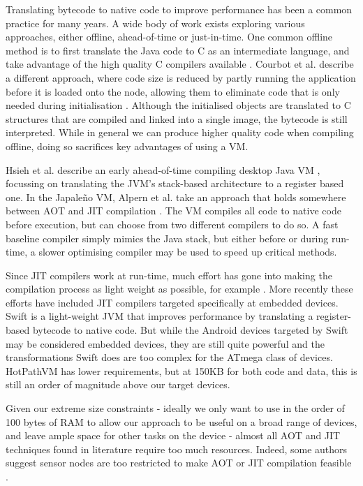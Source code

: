 Translating bytecode to native code to improve performance has been a common practice for many years. A wide body of work exists exploring various approaches, either offline, ahead-of-time  or just-in-time. One common offline method is to first translate the Java code to C as an intermediate language, and take advantage of the high quality C compilers available \cite{Muller:1997}. Courbot et al. describe a different approach, where code size is reduced by partly running the application before it is loaded onto the node, allowing them to eliminate code that is only needed during initialisation \cite{Courbot:2010}. Although the initialised objects are translated to C structures that are compiled and linked into a single image, the bytecode is still interpreted. While in general we can produce higher quality code when compiling offline, doing so sacrifices key advantages of using a VM.

Hsieh et al. describe an early ahead-of-time compiling desktop Java VM \cite{Hsieh:1996cy}, focussing on translating the JVM's stack-based architecture to a register based one. In the Japale\~no VM, Alpern et al. take an approach that holds somewhere between AOT and JIT compilation \cite{Alpern:1999}. The VM compiles all code to native code before execution, but can choose from two different compilers to do so. A fast baseline compiler simply mimics the Java stack, but either before or during run-time, a slower optimising compiler may be used to speed up critical methods.

Since JIT compilers work at run-time, much effort has gone into making the compilation process as light weight as possible, for example \cite{Krall:1998}. More recently these efforts have included JIT compilers targeted specifically at embedded devices. Swift \cite{Zhang:2012wf} is a light-weight JVM that improves performance by translating a register-based bytecode to native code. But while the Android devices targeted by Swift may be considered embedded devices, they are still quite powerful and the transformations Swift does are too complex for the ATmega class of devices. HotPathVM \cite{Gal:2006} has lower requirements, but at 150KB for both code and data, this is still an order of magnitude above our target devices.

Given our extreme size constraints - ideally we only want to use in the order of 100 bytes of RAM to allow our approach to be useful on a broad range of devices, and leave ample space for other tasks on the device - almost all AOT and JIT techniques found in literature require too much resources. Indeed, some authors suggest sensor nodes are too restricted to make AOT or JIT compilation feasible \cite{Aslam:2011thesis, Wirjawan:2008}.


